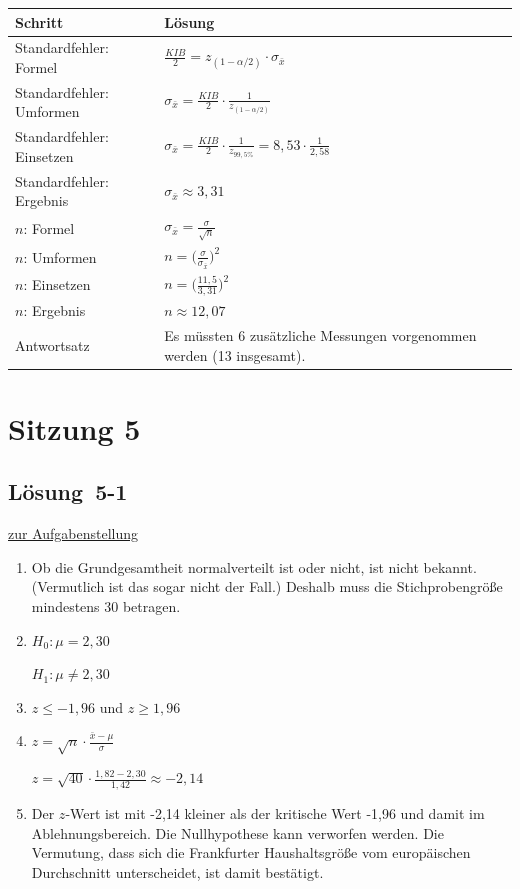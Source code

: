 \documentclass[
  11pt,
  ngerman,
  a4paper,
]{report}
\begin{document}
\begin{table}[H]
\centering
\begin{tabular}{ll}
\toprule
\textbf{Schritt} & \textbf{Lösung}\\
\midrule
Standardfehler: Formel & $\frac{\mathit{KIB}}{2} = z_{(1-\alpha/2)} \cdot \sigma_{\bar{x}}$\\
Standardfehler: Umformen & $\sigma_{\bar{x}} = \frac{\mathit{KIB}}{2} \cdot \frac{1}{z_{(1-\alpha/2)}}$\\
Standardfehler: Einsetzen & $\sigma_{\bar{x}}=\frac{\mathit{KIB}}{2}\cdot \frac{1}{z_{99{,}5\%}} = 8{,}53 \cdot \frac{1}{2{,}58}$\\
Standardfehler: Ergebnis & $\sigma_{\bar{x}} \approx 3{,}31$\\
$n$: Formel & $\sigma_{\bar{x}}=\frac{\sigma}{\sqrt{n}}$\\
$n$: Umformen & $n=\Big(\frac{\sigma}{\sigma_{\bar{x}}}\Big)^2$\\
$n$: Einsetzen & $n=\Big(\frac{11{,}5}{3{,}31}\Big)^2$\\
$n$: Ergebnis & $n\approx12{,}07$\\
Antwortsatz & Es müssten 6 zusätzliche Messungen  vorgenommen werden (13 insgesamt).\\
\bottomrule
\end{tabular}
\end{table}

\hypertarget{sitzung-5}{%
\section*{Sitzung 5}\label{sitzung-5}}

\hypertarget{loesung-5-1}{%
\subsection{Lösung~5-1}\label{loesung-5-1}}

\protect\hyperlink{aufgabe-5-1}{zur Aufgabenstellung}

\begin{enumerate}
\def\labelenumi{\alph{enumi})}
\item
  Ob die Grundgesamtheit normalverteilt ist oder nicht, ist nicht bekannt. (Vermutlich ist das sogar nicht der Fall.) Deshalb muss die Stichprobengröße mindestens 30 betragen.
\item
  \(H_0 : \mu = 2{,}30\)

  \(H_1 : \mu \neq 2{,}30\)
\item
  \(z \leq -1{,}96\) und \(z \geq 1{,}96\)
\item
  \(z=\sqrt{n}\cdot\frac{\bar{x}-\mu}{\sigma}\)

  \(z=\sqrt{40}\cdot\frac{1{,}82-2{,}30}{1{,}42}\approx-2{,}14\)
\item
  Der \(z\)-Wert ist mit -2,14 kleiner als der kritische Wert -1,96 und damit im Ablehnungsbereich. Die Nullhypothese kann verworfen werden. Die Vermutung, dass sich die Frankfurter Haushaltsgröße vom europäischen Durchschnitt unterscheidet, ist damit bestätigt.
\end{enumerate}
\end{document}
